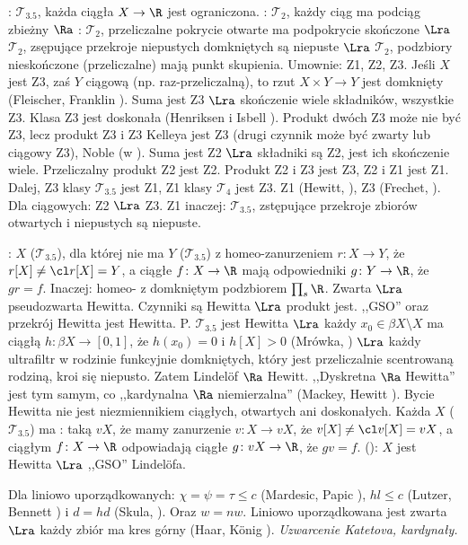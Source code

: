 :  $\mathcal T_{3.5}$, każda ciągła $X \to \R$ jest ograniczona.
: $\mathcal T_2$, każdy ciąg ma podciąg zbieżny $\Ra$ : $\mathcal T_2$, przeliczalne pokrycie otwarte ma podpokrycie skończone $\Lra$ $\mathcal T_2$, zsępujące przekroje niepustych domkniętych są niepuste $\Lra$ $\mathcal T_2$, podzbiory nieskończone (przeliczalne)  mają punkt skupienia.
Umownie: Z1, Z2, Z3.
Jeśli $X$ jest Z3, zaś $Y$ ciągową (np. raz-przeliczalną), to rzut $X \times Y \to Y$ jest domknięty (Fleischer, Franklin ).
Suma jest Z3 $\Lra$ skończenie wiele składników, wszystkie Z3.
Klasa Z3 jest doskonała (Henriksen i Isbell ).
Produkt dwóch Z3 może nie być Z3, lecz produkt Z3 i Z3 Kelleya jest Z3 (drugi czynnik może być zwarty lub ciągowy Z3), Noble (w ).
Suma jest Z2 $\Lra$ składniki są Z2, jest ich skończenie wiele.
Przeliczalny produkt Z2 jest Z2.
Produkt Z2 i Z3 jest Z3, Z2 i Z1 jest Z1.
Dalej, Z3 klasy $\mathcal T_{3.5}$ jest Z1, Z1 klasy $\mathcal T_4$ jest Z3.
Z1 (Hewitt, ), Z3 (Frechet, ).
Dla ciągowych: Z2 $\Lra$ Z3.
Z1 inaczej: $\mathcal T_{3.5}$, zstępujące przekroje zbiorów otwartych i niepustych są niepuste.

:  $X$ ($\mathcal T_{3.5}$), dla której nie ma $Y$ ($\mathcal T_{3.5}$) z homeo-zanurzeniem $r \colon X \to Y$, że $r[X] \neq \cl r[X] = Y$, a ciągłe $f \colon X \to \R$ mają odpowiedniki $g \colon Y \to \R$, że $gr = f$.
Inaczej: homeo- z domkniętym podzbiorem $\prod_s \R$.
Zwarta $\Lra$ pseudozwarta Hewitta.
Czynniki są Hewitta $\Lra$ produkt jest.
,,GSO'' oraz przekrój Hewitta jest Hewitta.
P. $\mathcal T_{3.5}$ jest Hewitta $\Lra$ każdy $x_0 \in \beta X \setminus X$ ma ciągłą $h \colon \beta X \to [0,1]$, że $h(x_0) = 0$ i $h[X] > 0$ (Mrówka, ) $\Lra$ każdy ultrafiltr w rodzinie funkcyjnie domkniętych, który jest przeliczalnie scentrowaną rodziną, kroi się niepusto.
Zatem Lindelöf $\Ra$ Hewitt.
,,Dyskretna $\Ra$ Hewitta'' jest tym samym, co ,,kardynalna $\Ra$ niemierzalna'' (Mackey, Hewitt ).
Bycie Hewitta nie jest niezmiennikiem ciągłych, otwartych ani doskonałych.
Każda $X$ ($\mathcal T_{3.5}$) ma : taką $vX$, że mamy zanurzenie $v \colon X \to vX$, że $v[X] \neq \cl v[X] = vX$, a ciągłym $f \colon X \to \R$ odpowiadają ciągłe $g \colon vX \to \R$, że $gv = f$.
 (): $X$ jest Hewitta $\Lra$ ,,GSO'' Lindelöfa. 

Dla  liniowo uporządkowanych: $\chi = \psi = \tau \le c$ (Mardesic, Papic ), $hl \le c$ (Lutzer, Bennett ) i $d = hd$ (Skula, ).
Oraz $w = nw$.
Liniowo uporządkowana jest zwarta $\Lra$ każdy zbiór ma kres górny (Haar, König ).
\emph{Uzwarcenie Katetova, kardynały.}